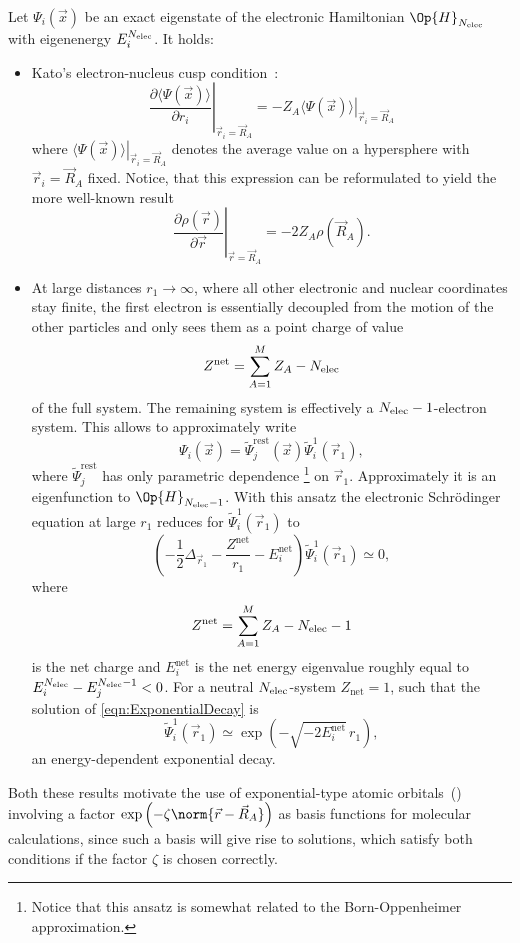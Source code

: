 \begin{rem}
	\label{rem:PhysicalProperties}
	Let $\Psi_i(\vec{x})$ be an exact eigenstate of the electronic
	Hamiltonian $\Op{H}_{\Nelec}$ with eigenenergy $E^{N_\text{elec}}_i$.
	It holds:
	\begin{itemize}
		\item Kato's electron-nucleus cusp condition~\cite{Kato1957}:
			\[
				\left. \frac{\partial \langle\Psi(\vec{x})\rangle}
				{\partial r_i} \right|_{\vec{r}_i = \vec{R}_A}
				= -Z_A \left. \langle\Psi(\vec{x})\rangle \right|_{\vec{r}_i = \vec{R}_A}
			\]
			where $\left. \langle\Psi(\vec{x})\rangle \right|_{\vec{r}_i = \vec{R}_A}$
			denotes the average value on a hypersphere with $\vec{r}_i = \vec{R}_A$ fixed.
			Notice, that this expression can be reformulated to yield
			the more well-known result
			\[
				\left. \frac{\partial \rho(\vec{r})}{\partial \vec{r}} \right|_{\vec{r} = \vec{R}_A}
				= -2 Z_A \rho(\vec{R}_A).
			\]
		\item At large distances $r_1 \to \infty$,
			where all other electronic and nuclear coordinates stay finite,
			the first electron is essentially decoupled from the motion
			of the other particles and only sees them as a point charge
			of value
			\[ Z^\text{net} = \sum_{A=1}^M Z_A - N_\text{elec}\]
			of the full system.
			The remaining system is effectively a $N_\text{elec}-1$-electron system.
			This allows to approximately write
			\[ \Psi_i(\vec{x}) = \tilde{\Psi}^\text{rest}_j(\vec{x}) \tilde{\Psi}^1_i(\vec{r}_1), \]
			where $\tilde{\Psi}^\text{rest}_j$ has only parametric dependence%
			\footnote{Notice that this ansatz is somewhat related to the Born-Oppenheimer
			approximation.}
			on $\vec{r}_1$.
			Approximately it is an eigenfunction to $\Op{H}_{\Nelec-1}$.
			With this ansatz the electronic Schrödinger equation at large $r_1$
			reduces for $\tilde{\Psi}^1_i(\vec{r}_1)$ to
			\begin{equation}
				\left( -\frac12 \Delta_{\vec{r}_1} - \frac{Z^\text{net}}{r_1} - E^\text{net}_i \right)
				\tilde{\Psi}_i^1(\vec{r}_1) \simeq 0,
				\label{eqn:ExponentialDecay}
			\end{equation}
			where
			\[ Z^\text{net} = \sum_{A=1}^M Z_A - N_\text{elec} - 1\]
			is the net charge and $E^\text{net}_i$ is the net energy eigenvalue
			roughly equal to \linebreak
			$E^{N_\text{elec}}_i - E^{N_\text{elec}-1}_j < 0$.
			For a neutral $N_\text{elec}$-system $Z_\text{net} = 1$,
			such that the solution of \eqref{eqn:ExponentialDecay} is
			\[ \tilde{\Psi}_i^1(\vec{r}_1) \simeq \exp\left( - \sqrt{-2E^\text{net}_i} \, r_1 \right), \]
			\ie an energy-dependent exponential decay.
	\end{itemize}
\end{rem}
Both these results motivate the use of exponential-type atomic orbitals~(\ETO)
involving a factor $\exp\left(-\zeta \norm{\vec{r} - \vec{R}_A} \right)$
as basis functions for molecular calculations,
since such a basis will give rise to solutions,
which satisfy both conditions if the factor $\zeta$ is chosen correctly.

